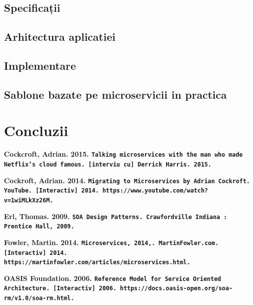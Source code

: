 \documentclass[12pt]{report}
\begin{document}
	\section{Specificații}
	\section{Arhitectura aplicatiei}
	\section{Implementare}
	\section{Sablone bazate pe microservicii in practica}
\chapter{Concluzii}




\begin{flushleft}
\textbf{Cockcroft, Adrian. 2015. \texttt{Talking microservices with the man who made Netflix’s cloud famous. [interviu cu] Derrick Harris. 2015.}}
\end{flushleft}

\begin{flushleft}
\textbf{
Cockroft, Adrian. 2014. \texttt{Migrating to Microservices by Adrian Cockroft. YouTube. [Interactiv] 2014. https://www.youtube.com/watch?v=1wiMLkXz26M.}}
\end{flushleft}

\begin{flushleft}
\textbf{
Erl, Thomas. 2009. \texttt{SOA Design Patterns. Crawfordville Indiana : Prentice Hall, 2009.}}
\end{flushleft}

\begin{flushleft}
\textbf{
Fowler, Martin. 2014. \texttt{Microservices, 2014,. MartinFowler.com. [Interactiv] 2014. https://martinfowler.com/articles/microservices.html.}}
\end{flushleft}

\begin{flushleft}
\textbf{
OASIS Foundation. 2006. \texttt{Reference Model for Service Oriented Architecture. [Interactiv] 2006. https://docs.oasis-open.org/soa-rm/v1.0/soa-rm.html.}}
\end{flushleft}
\end{document}
